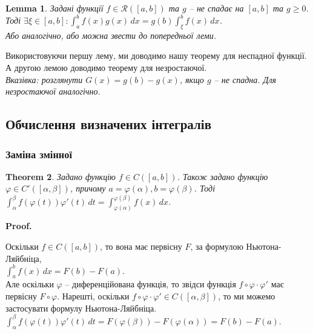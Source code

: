 \documentclass[a4paper, 10pt]{article}
\makeatletter
\def\huge{\displaystyle}
\def\qed{$\blacksquare$}
\theoremstyle{theoremdd}
\newtheorem{theorem}{Theorem}[subsection]
\theoremstyle{theoremdd}
\theoremstyle{theoremdd}
\theoremstyle{theoremdd}
\theoremstyle{theoremdd}
\theoremstyle{theoremdd}
\theoremstyle{theoremdd}
\theoremstyle{theoremdd}
\newtheorem{lemma}[theorem]{Lemma}
\theoremstyle{theoremdd}
\renewenvironment{proof}[1][Proof.\\]{\par
\pushQED{\hfill \qed}%
\normalfont \topsep6\p@\@plus6\p@\relax
\trivlist
\item\relax
{\bfseries
#1\@addpunct{.}}\hspace\labelsep\ignorespaces
}{%
\popQED\endtrivlist\@endpefalse
}
\makeatother
\begin{document}
\begin{lemma}
Задані функції $f \in \mathcal{R}([a,b])$ та $g$ -- не спадає на $[a,b]$ та $g \geq 0$. Тоді $\exists \xi \in [a,b]: \huge\int_a^b f(x)g(x)\,dx = g(b) \int_\xi^b f(x)\,dx$.\\
\textit{Або аналогічно, або можна звести до попередньої леми.}
\end{lemma}

Використовуючи першу лему, ми доводимо нашу теорему для неспадної функції. А другою лемою доводимо теорему для незростаючої.\\
\textit{Вказівка: розглянути $G(x) = g(b) - g(x)$, якщо $g$ -- не спадна. Для незростаючої аналогічно.}

\subsection{Обчислення визначених інтегралів}
\subsubsection{Заміна змінної}
\iffalse
\begin{theorem}
Задано функцію $f \in C((A,B))$. Також задано функцію $\varphi \in C'([\alpha,\beta])$, причому $\varphi([\alpha,\beta]) \subset (A,B)$. Тоді
$\huge\int_\alpha^\beta f(\varphi(t))\varphi'(t)\,dt = \int_{\varphi(\alpha)}^{\varphi(\beta)} f(x)\,dx$.
\end{theorem}
\fi

\begin{theorem}
Задано функцію $f \in C([a,b])$. Також задано функцію $\varphi \in C'([\alpha,\beta])$, причому $a = \varphi(\alpha), b = \varphi(\beta)$. Тоді $\huge\int_\alpha^\beta f(\varphi(t))\varphi'(t)\,dt = \int_{\varphi(\alpha)}^{\varphi(\beta)} f(x)\,dx$.
\end{theorem}

\begin{proof}
Оскільки $f \in C([a,b])$, то вона має первісну $F$, за формулою Ньютона-Ляйбніца,\\
$\displaystyle\int_a^b f(x)\,dx = F(b) - F(a)$.\\
Але оскільки $\varphi$ -- диференційована функція, то звідси функція $f \circ \varphi \cdot \varphi'$ має первісну $F \circ \varphi$. Нарешті, оскільки $f \circ \varphi \cdot \varphi' \in C([\alpha,\beta])$, то ми можемо застосувати формулу Ньютона-Ляйбніца.\\
$\displaystyle\int_\alpha^\beta f(\varphi(t))\varphi'(t)\,dt = F(\varphi(\beta)) - F(\varphi(\alpha)) = F(b) - F(a)$.
\end{proof}
\end{document}
